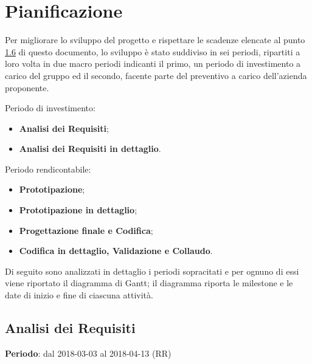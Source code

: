 \newpage
\section{Pianificazione}

Per migliorare lo sviluppo del progetto e rispettare le scadenze elencate al punto \hyperref[Scadenze]{1.6} di questo documento, lo sviluppo è stato suddiviso in sei periodi, ripartiti a loro volta in due macro periodi indicanti il primo, un periodo di investimento a carico del gruppo \Gruppo ed il secondo, facente parte del preventivo a carico dell'azienda proponente.

Periodo di investimento:
\begin{itemize}
\item \textbf{Analisi dei Requisiti};
\item \textbf{Analisi dei Requisiti in dettaglio}.
\end{itemize}
Periodo rendicontabile:
\begin{itemize}
\item \textbf{Prototipazione};
\item \textbf{Prototipazione in dettaglio};
\item \textbf{Progettazione finale e Codifica};
\item \textbf{Codifica in dettaglio, Validazione e Collaudo}.
\end{itemize}
Di seguito sono analizzati in dettaglio i periodi sopracitati e per ognuno di essi viene riportato il diagramma di Gantt; il diagramma riporta le milestone e le date di inizio e fine di ciascuna attività.

\subsection{Analisi dei Requisiti}
\textbf{Periodo}: dal 2018-03-03 al 2018-04-13 (RR)\\

